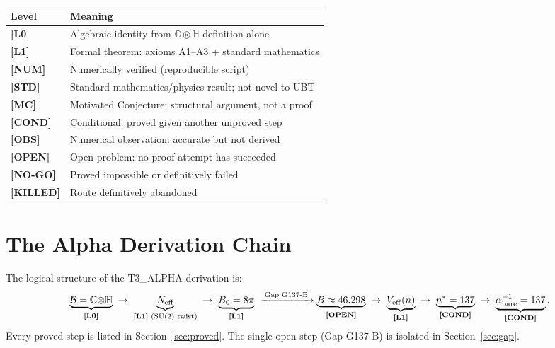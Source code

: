 \documentclass[12pt,a4paper]{article}
\theoremstyle{definition}
\theoremstyle{remark}
\newcommand{\Lzero}{\textbf{[L0]}}
\newcommand{\Lone}{\textbf{[L1]}}
\newcommand{\NUM}{\textbf{[NUM]}}
\newcommand{\STD}{\textbf{[STD]}}
\newcommand{\MC}{\textbf{[MC]}}
\newcommand{\COND}{\textbf{[COND]}}
\newcommand{\OBS}{\textbf{[OBS]}}
\newcommand{\OPEN}{\textbf{[OPEN]}}
\newcommand{\NOGO}{\textbf{[NO-GO]}}
\newcommand{\KILLED}{\textbf{[KILLED]}}
\begin{document}
\begin{center}
\begin{tabular}{ll}
\toprule
\textbf{Level} & \textbf{Meaning} \\
\midrule
\Lzero & Algebraic identity from $\mathbb{C}\otimes\mathbb{H}$ definition alone \\
\Lone  & Formal theorem: axioms A1--A3 + standard mathematics \\
\NUM   & Numerically verified (reproducible script) \\
\STD   & Standard mathematics/physics result; not novel to UBT \\
\MC    & Motivated Conjecture: structural argument, not a proof \\
\COND  & Conditional: proved given another unproved step \\
\OBS   & Numerical observation: accurate but not derived \\
\OPEN  & Open problem: no proof attempt has succeeded \\
\NOGO  & Proved impossible or definitively failed \\
\KILLED & Route definitively abandoned \\
\bottomrule
\end{tabular}
\end{center}

\section{The Alpha Derivation Chain}
\label{sec:chain}

The logical structure of the T3\_ALPHA derivation is:
\begin{equation}
  \underbrace{\mathcal{B}=\mathbb{C}{\otimes}\mathbb{H}}_{\text{\Lzero}}
  \;\to\;
  \underbrace{N_{\mathrm{eff}}}_{\text{\Lone\ (SU(2) twist)}}
  \;\to\;
  \underbrace{B_0 = 8\pi}_{\text{\Lone}}
  \;\xrightarrow{\;\text{Gap G137-B}\;}
  \underbrace{B \approx 46.298}_{\text{\OPEN}}
  \;\to\;
  \underbrace{V_{\mathrm{eff}}(n)}_{\text{\Lone}}
  \;\to\;
  \underbrace{n^* = 137}_{\text{\COND}}
  \;\to\;
  \underbrace{\alpha^{-1}_{\mathrm{bare}} = 137}_{\text{\COND}}.
  \label{eq:chain}
\end{equation}
Every proved step is listed in Section~\ref{sec:proved}.
The single open step (Gap G137-B) is isolated in Section~\ref{sec:gap}.
\end{document}
